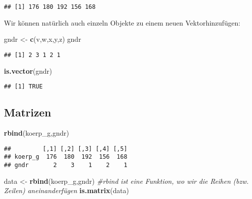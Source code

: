 \documentclass[
]{book}
\newenvironment{Shaded}{\begin{snugshade}}{\end{snugshade}}
\newcommand{\CommentTok}[1]{\textcolor[rgb]{0.56,0.35,0.01}{\textit{#1}}}
\newcommand{\KeywordTok}[1]{\textcolor[rgb]{0.13,0.29,0.53}{\textbf{#1}}}
\newcommand{\NormalTok}[1]{#1}
\newcommand{\StringTok}[1]{\textcolor[rgb]{0.31,0.60,0.02}{#1}}
\begin{document}
\begin{verbatim}
## [1] 176 180 192 156 168
\end{verbatim}

Wir können natürlich auch einzeln Objekte zu einem neuen Vektorhinzufügen:

\begin{Shaded}
\begin{Highlighting}[]
\NormalTok{gndr <-}\StringTok{ }\KeywordTok{c}\NormalTok{(v,w,x,y,z)}
\NormalTok{gndr}
\end{Highlighting}
\end{Shaded}

\begin{verbatim}
## [1] 2 3 1 2 1
\end{verbatim}

\begin{Shaded}
\begin{Highlighting}[]
\KeywordTok{is.vector}\NormalTok{(gndr)}
\end{Highlighting}
\end{Shaded}

\begin{verbatim}
## [1] TRUE
\end{verbatim}

\hypertarget{matrizen}{%
\subsection{Matrizen}\label{matrizen}}

\begin{Shaded}
\begin{Highlighting}[]
\KeywordTok{rbind}\NormalTok{(koerp_g,gndr)}
\end{Highlighting}
\end{Shaded}

\begin{verbatim}
##         [,1] [,2] [,3] [,4] [,5]
## koerp_g  176  180  192  156  168
## gndr       2    3    1    2    1
\end{verbatim}

\begin{Shaded}
\begin{Highlighting}[]
\NormalTok{data <-}\StringTok{ }\KeywordTok{rbind}\NormalTok{(koerp_g,gndr) }\CommentTok{#rbind ist eine Funktion, wo wir die Reihen (bzw. Zeilen) aneinanderfügen}
\KeywordTok{is.matrix}\NormalTok{(data)}
\end{Highlighting}
\end{Shaded}
\end{document}
